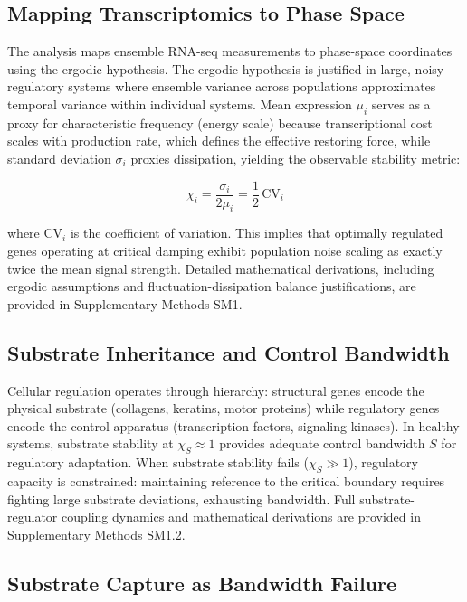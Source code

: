 \documentclass[11pt,letterpaper]{article}
\begin{document}
\subsection{Mapping Transcriptomics to Phase Space}

The analysis maps ensemble RNA-seq measurements to phase-space coordinates using the ergodic hypothesis. The ergodic hypothesis is justified in large, noisy regulatory systems where ensemble variance across populations approximates temporal variance within individual systems. Mean expression $\mu_i$ serves as a proxy for characteristic frequency (energy scale) because transcriptional cost scales with production rate, which defines the effective restoring force, while standard deviation $\sigma_i$ proxies dissipation, yielding the observable stability metric:

\begin{equation}
\chi_i = \frac{\sigma_i}{2\mu_i} = \frac{1}{2} \, \text{CV}_i
\label{eq:chi_observable}
\end{equation}

where $\text{CV}_i$ is the coefficient of variation. This implies that optimally regulated genes operating at critical damping exhibit population noise scaling as exactly twice the mean signal strength. Detailed mathematical derivations, including ergodic assumptions and fluctuation-dissipation balance justifications, are provided in Supplementary Methods SM1.

\subsection{Substrate Inheritance and Control Bandwidth}

Cellular regulation operates through hierarchy: structural genes encode the physical substrate (collagens, keratins, motor proteins) while regulatory genes encode the control apparatus (transcription factors, signaling kinases). In healthy systems, substrate stability at $\chi_S \approx 1$ provides adequate control bandwidth $S$ for regulatory adaptation. When substrate stability fails ($\chi_S \gg 1$), regulatory capacity is constrained: maintaining reference to the critical boundary requires fighting large substrate deviations, exhausting bandwidth. Full substrate-regulator coupling dynamics and mathematical derivations are provided in Supplementary Methods SM1.2.

\subsection{Substrate Capture as Bandwidth Failure}
\end{document}
